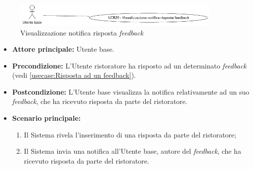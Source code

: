 \newpage
{}
\label{usecase:Visualizzazione notifica risposta feedback}

\begin{figure}[h]
	\centering
	\includegraphics[width=0.9\textwidth]{./uml/UCB20.png} 
	\caption{Visualizzazione notifica risposta \textit{feedback}}
	\label{fig:UCB19}
  \end{figure}

\begin{itemize}
	\item \textbf{Attore principale:} Utente base.

	\item \textbf{Precondizione:} L'Utente ristoratore ha risposto ad un determinato \textit{feedback} (vedi \autoref{usecase:Risposta ad un feedback}).


	\item \textbf{Postcondizione:} L'Utente base visualizza la notifica relativamente ad un suo \textit{feedback}, che ha ricevuto risposta da parte del ristoratore.

	\item \textbf{Scenario principale:}
	      \begin{enumerate}
		      \item Il Sistema rivela l'inserimento di una risposta da parte del ristoratore;

		      \item Il Sistema invia una notifica all'Utente base, autore del \textit{feedback}, che ha ricevuto risposta da parte del ristoratore.
	      \end{enumerate}
\end{itemize}
